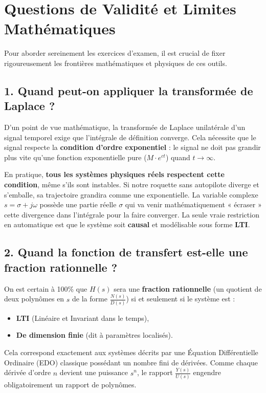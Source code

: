 \documentclass[11pt,a4paper]{report}
\begin{document}
\section{Questions de Validité et Limites Mathématiques}

Pour aborder sereinement les exercices d'examen, il est crucial de fixer rigoureusement les frontières mathématiques et physiques de ces outils.

\subsection{1. Quand peut-on appliquer la transformée de Laplace ?}
D'un point de vue mathématique, la transformée de Laplace unilatérale d'un signal temporel exige que l'intégrale de définition converge. Cela nécessite que le signal respecte la \textbf{condition d'ordre exponentiel} : le signal ne doit pas grandir plus vite qu'une fonction exponentielle pure ($M \cdot e^{ct}$) quand $t \to \infty$.

En pratique, \textbf{tous les systèmes physiques réels respectent cette condition}, même s'ils sont instables. Si notre roquette sans autopilote diverge et s'emballe, sa trajectoire grandira comme une exponentielle. La variable complexe $s = \sigma + j\omega$ possède une partie réelle $\sigma$ qui va venir mathématiquement « écraser » cette divergence dans l'intégrale pour la faire converger. La seule vraie restriction en automatique est que le système soit \textbf{causal} et modélisable sous forme \textbf{LTI}.

\subsection{2. Quand la fonction de transfert est-elle une fraction rationnelle ?}
On est certain à 100\% que $H(s)$ sera une \textbf{fraction rationnelle} (un quotient de deux polynômes en $s$ de la forme $\frac{N(s)}{D(s)}$) si et seulement si le système est :
\begin{itemize}
    \item \textbf{LTI} (Linéaire et Invariant dans le temps),
    \item \textbf{De dimension finie} (dit à paramètres localisés).
\end{itemize}
Cela correspond exactement aux systèmes décrits par une Équation Différentielle Ordinaire (EDO) classique possédant un nombre fini de dérivées. Comme chaque dérivée d'ordre $n$ devient une puissance $s^n$, le rapport $\frac{Y(s)}{U(s)}$ engendre obligatoirement un rapport de polynômes. 
\end{document}
